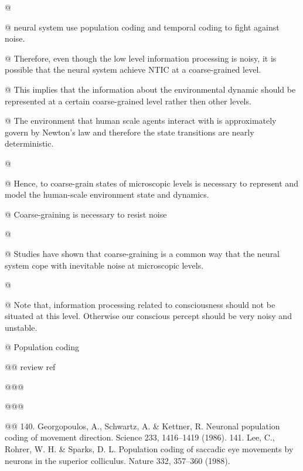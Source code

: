 \documentclass[utf8]{article}
\begin{document}
		\begin{WritingMaterials}
			@ 

			@ neural system use population coding and temporal coding to fight against noise.

			@ Therefore, even though the low level information processing is noisy, it is possible that the neural system achieve NTIC at a coarse-grained level.

			@ This implies that the information about the environmental dynamic should be represented at a certain coarse-grained level rather then other levels.

			@ The environment that human scale agents interact with is approximately govern by Newton's law and therefore the state transitions are nearly deterministic.

			@ 
			
			@ Hence, to coarse-grain states of microscopic levels is necessary to represent and model the human-scale environment state and dynamics.

			@ Coarse-graining is necessary to resist noise

			@  \cite{eurich2000multidimensional}


			@ Studies have shown that coarse-graining is a common way that the neural system cope with inevitable noise at microscopic levels.

			@ 


			@ Note that, information processing related to consciousness should not be situated at this level. Otherwise our conscious percept should be very noisy and unstable.

			@ Population coding

				@@ review ref

					@@@ \cite{Stanley2013}

					@@@ \cite{QuianQuiroga2009}

				@@ 
									140. Georgopoulos, A., Schwartz, A. \& Kettner, R. Neuronal population coding of movement direction. Science 233, 1416–1419 (1986). 141. Lee, C., Rohrer, W. H. \& Sparks, D. L. Population coding of saccadic eye movements by neurons in the superior colliculus. Nature 332, 357–360 (1988).


\end{WritingMaterials}
\end{document}
